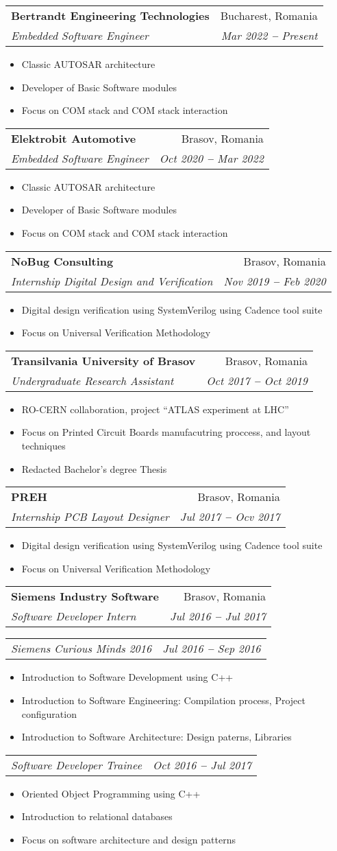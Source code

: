 \documentclass[letterpaper,11pt]{article}
\makeatletter
\newcommand{\resumeItem}[1]{
  \item\small{
    {#1 \vspace{-2pt}}
  }
}
\newcommand{\resumeSubheading}[4]{
  \vspace{-2pt}\item
    \begin{tabular*}{0.97\textwidth}[t]{l@{\extracolsep{\fill}}r}
      \textbf{#1} & #2 \\
      \textit{\small#3} & \textit{\small #4} \\
    \end{tabular*}\vspace{-7pt}
}
\newcommand{\resumeSubSubheading}[2]{
    \vspace{-2pt}\item
    \begin{tabular*}{0.97\textwidth}{l@{\extracolsep{\fill}}r}
      \textit{\small#1} & \textit{\small #2} \\
    \end{tabular*}\vspace{-7pt}
}
\newcommand{\resumeItemListStart}{\begin{itemize}}
\newcommand{\resumeItemListEnd}{\end{itemize}\vspace{-5pt}}
\makeatother
\begin{document}
    \resumeSubheading
      {Bertrandt Engineering Technologies}{Bucharest, Romania}
      {Embedded Software Engineer}{Mar 2022 \textbf{--} Present}
        \resumeItemListStart
            \resumeItem{Classic AUTOSAR architecture}
            \resumeItem{Developer of Basic Software modules}
            \resumeItem{Focus on COM stack and COM stack interaction}
        \resumeItemListEnd

    \resumeSubheading
      {Elektrobit Automotive}{Brasov, Romania}
      {Embedded Software Engineer}{Oct 2020 \textbf{--} Mar 2022}
        \resumeItemListStart
            \resumeItem{Classic AUTOSAR architecture}
            \resumeItem{Developer of Basic Software modules}
            \resumeItem{Focus on COM stack and COM stack interaction}
        \resumeItemListEnd

    \resumeSubheading
      {NoBug Consulting}{Brasov, Romania}
      {Internship Digital Design and Verification}{Nov 2019 \textbf{--} Feb 2020}
        \resumeItemListStart
            \resumeItem{Digital design verification using SystemVerilog using Cadence tool suite}
            \resumeItem{Focus on Universal Verification Methodology}
        \resumeItemListEnd

    \resumeSubheading
      {Transilvania University of Brasov}{Brasov, Romania}
      {Undergraduate Research Assistant}{Oct 2017 \textbf{--} Oct 2019}
        \resumeItemListStart
            \resumeItem{RO-CERN collaboration, project ``ATLAS experiment at LHC''}
            \resumeItem{Focus on Printed Circuit Boards manufacutring proccess, and layout techniques}
            \resumeItem{Redacted Bachelor's degree Thesis}
        \resumeItemListEnd

    \resumeSubheading
      {PREH}{Brasov, Romania}
      {Internship PCB Layout Designer}{Jul 2017 \textbf{--} Ocv 2017}
        \resumeItemListStart
            \resumeItem{Digital design verification using SystemVerilog using Cadence tool suite}
            \resumeItem{Focus on Universal Verification Methodology}
        \resumeItemListEnd

    \resumeSubheading
      {Siemens Industry Software}{Brasov, Romania}
      {Software Developer Intern}{Jul 2016 \textbf{--} Jul 2017}
      \resumeSubSubheading
        {Siemens Curious Minds 2016}{Jul 2016 \textbf{--} Sep 2016}
        \resumeItemListStart
          \resumeItem{Introduction to Software Development using C++}
          \resumeItem{Introduction to Software Engineering: Compilation process, Project configuration}
          \resumeItem{Introduction to Software Architecture: Design paterns, Libraries}
        \resumeItemListEnd
      \resumeSubSubheading
        {Software Developer Trainee}{Oct 2016 \textbf{--} Jul 2017}
        \resumeItemListStart
          \resumeItem{Oriented Object Programming using C++}
          \resumeItem{Introduction to relational databases}
          \resumeItem{Focus on software architecture and design patterns}
        \resumeItemListEnd
\end{document}
